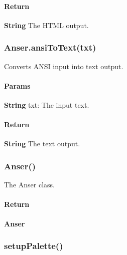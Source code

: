\paragraph*{Return}


\begin{DoxyItemize}
\item {\bfseries String} The H\+T\+ML output.
\end{DoxyItemize}

\subsubsection*{{\ttfamily Anser.\+ansi\+To\+Text(txt)}}

Converts A\+N\+SI input into text output. \paragraph*{Params}


\begin{DoxyItemize}
\item {\bfseries String} {\ttfamily txt}\+: The input text.
\end{DoxyItemize}

\paragraph*{Return}


\begin{DoxyItemize}
\item {\bfseries String} The text output.
\end{DoxyItemize}

\subsubsection*{{\ttfamily Anser()}}

The {\ttfamily Anser} class.

\paragraph*{Return}


\begin{DoxyItemize}
\item {\bfseries Anser}
\end{DoxyItemize}

\subsubsection*{{\ttfamily setup\+Palette()}}

